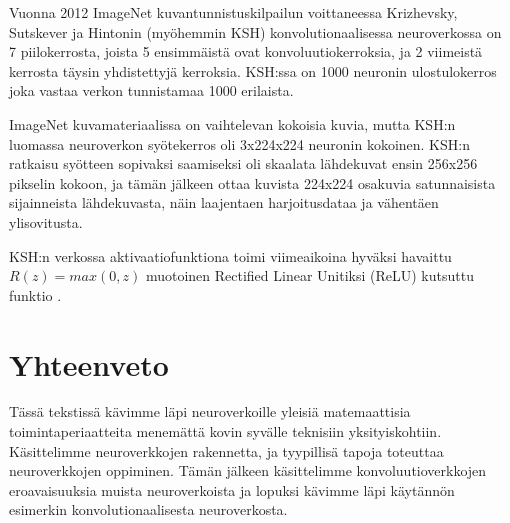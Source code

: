 \documentclass[finnish]{tktltiki2}
\theoremstyle{definition}
\theoremstyle{remark}
\begin{document}
    Vuonna 2012 ImageNet kuvantunnistuskilpailun voittaneessa Krizhevsky, Sutskever ja Hintonin (myöhemmin KSH) konvolutionaalisessa neuroverkossa on 7 piilokerrosta, joista 5 ensimmäistä ovat konvoluutiokerroksia, ja 2 viimeistä kerrosta täysin yhdistettyjä kerroksia. KSH:ssa on 1000 neuronin ulostulokerros joka vastaa verkon tunnistamaa 1000 erilaista.
    
    ImageNet kuvamateriaalissa on vaihtelevan kokoisia kuvia, mutta KSH:n luomassa neuroverkon syötekerros oli 3x224x224 neuronin kokoinen. KSH:n ratkaisu syötteen sopivaksi saamiseksi oli skaalata lähdekuvat ensin 256x256 pikselin kokoon, ja tämän jälkeen ottaa kuvista 224x224 osakuvia satunnaisista sijainneista lähdekuvasta, näin laajentaen harjoitusdataa ja vähentäen ylisovitusta.
    
    KSH:n verkossa aktivaatiofunktiona toimi viimeaikoina hyväksi havaittu $R(z) = max(0, z)$ muotoinen Rectified Linear Unitiksi (ReLU) kutsuttu funktio \cite{KSHimagenet2012}.

\section{Yhteenveto} 

Tässä tekstissä kävimme läpi neuroverkoille yleisiä matemaattisia toimintaperiaatteita menemättä kovin syvälle teknisiin yksityiskohtiin. Käsittelimme neuroverkkojen rakennetta, ja tyypillisä tapoja toteuttaa neuroverkkojen oppiminen. Tämän jälkeen käsittelimme konvoluutioverkkojen eroavaisuuksia muista neuroverkoista ja lopuksi kävimme läpi käytännön esimerkin konvolutionaalisesta neuroverkosta.








  \nocite{*}
  
  





  
\end{document}
